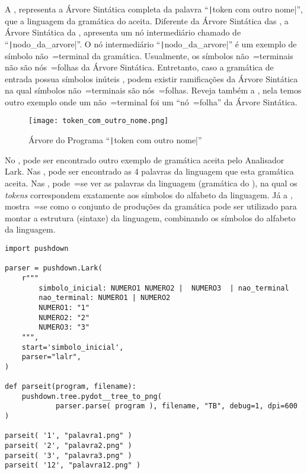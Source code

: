 A ,
representa a Árvore Sintática completa da palavra ``\texttt|token com outro nome|'',
que a linguagem da gramática do  aceita.
Diferente da Árvore Sintática das ,
a Árvore Sintática da ,
apresenta um nó intermediário chamado de ``\texttt|nodo_da_arvore|''.
O nó intermediário ``\texttt|nodo_da_arvore|'' é um exemplo de símbolo não~=terminal da gramática.
Usualmente,
os símbolos não~=terminais não são nós~=folhas da Árvore Sintática.
Entretanto,
caso a gramática de entrada possua símbolos inúteis \cite{hopcroftBook},
podem existir ramificações da Árvore Sintática na qual símbolos não~=terminais são nós~=folhas.
Reveja também a ,
nela temos outro exemplo onde um não~=terminal foi um ``nó~=folha'' da Árvore Sintática.
\begin{figure}[H]
\caption[Árvore do Programa ``token com outro nome'']{Árvore do Programa ``\texttt|token com outro nome|''}
\label{figure:ArvoresDosTokens3}
\centering
\texttt{[image: token\_com\_outro\_nome.png]}
\end{figure}

No ,
pode ser encontrado outro exemplo de gramática aceita pelo Analisador Lark.
Nas ,
pode ser encontrado as 4 palavras da linguagem que esta gramática aceita.
Nas ,
pode~=se ver as palavras da linguagem (gramática do ),
na qual os \textit{tokens} correspondem exatamente aos símbolos do alfabeto da linguagem.
Já a ,
mostra~=se como o conjunto de produções da gramática pode ser utilizado para montar a estrutura (sintaxe) da linguagem,
combinando os símbolos do alfabeto da linguagem.
\begin{code}
\caption{Exemplo de gramática com uma Estrutura de Sintaxe}
\label{code:ExemploDeEstruturaDeGramaticaLark}
\begin{verbatim}
import pushdown

parser = pushdown.Lark(
    r"""
        simbolo_inicial: NUMERO1 NUMERO2 |  NUMERO3  | nao_terminal
        nao_terminal: NUMERO1 | NUMERO2
        NUMERO1: "1"
        NUMERO2: "2"
        NUMERO3: "3"
    """,
    start='simbolo_inicial',
    parser="lalr",
)

def parseit(program, filename):
    pushdown.tree.pydot__tree_to_png(
            parser.parse( program ), filename, "TB", debug=1, dpi=600 )

parseit( '1', "palavra1.png" )
parseit( '2', "palavra2.png" )
parseit( '3', "palavra3.png" )
parseit( '12', "palavra12.png" )
\end{verbatim}
\end{code}

